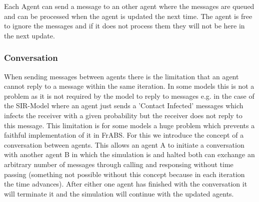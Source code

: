 Each Agent can send a message to an other agent where the messages are queued and can be processed when the agent is updated the next time. The agent is free to ignore the messages and if it does not process them they will not be here in the next update.

\subsubsection{Conversation}
When sending messages between agents there is the limitation that an agent cannot reply to a message within the same iteration. In some models this is not a problem as it is not required by the model to reply to messages e.g. in the case of the SIR-Model where an agent just sends a 'Contact Infected' messages which infects the receiver with a given probability but the receiver does not reply to this message.
This limitation is for some models a huge problem which prevents a faithful implementation of it in FrABS. For this we introduce the concept of a conversation between agents. This allows an agent A to initiate a conversation with another agent B in which the simulation is and halted both can exchange an arbitrary number of messages through calling and responsing without time passing (something not possible without this concept because in each iteration the time advances). After either one agent has finished with the conversation it will terminate it and the simulation will continue with the updated agents.